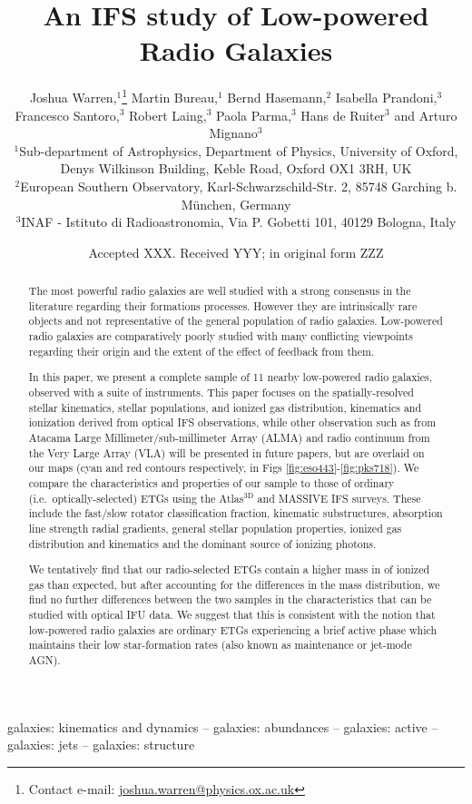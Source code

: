 \documentclass[a4paper,fleqn,usenatbib]{mnras}
\title[An IFS study of Low-powered Radio Galaxies]{An IFS study of Low-powered Radio Galaxies}
\author[J. Warren et al.]{
Joshua Warren,$^{1}$\thanks{Contact e-mail: \href{mailto:joshua.warren@physics.ox.ac.uk}{joshua.warren@physics.ox.ac.uk}}
Martin Bureau,$^{1}$
Bernd Hasemann,$^{2}$
Isabella Prandoni,$^{3}$ \newauthor
Francesco Santoro,$^{3}$
Robert Laing,$^{3}$
Paola Parma,$^{3}$
Hans de Ruiter$^{3}$
and \newauthor
Arturo Mignano$^{3}$
\\
$^{1}$Sub-department of Astrophysics, Department of Physics, University of Oxford, Denys Wilkinson Building, Keble Road, Oxford OX1 3RH, UK\\
$^{2}$European Southern Observatory, Karl-Schwarzschild-Str. 2, 85748 Garching b. München, Germany\\
$^{3}$INAF - Istituto di Radioastronomia, Via P. Gobetti 101, 40129 Bologna, Italy}
\date{Accepted XXX. Received YYY; in original form ZZZ}
\begin{document}
\label{firstpage}
\pagerange{\pageref{firstpage}--\pageref{lastpage}}
\maketitle

\begin{abstract}
The most powerful radio galaxies are well studied with a strong consensus in the literature regarding their formations processes. However they are intrinsically rare objects and not representative of the general population of radio galaxies. Low-powered radio galaxies are comparatively poorly studied with many conflicting viewpoints regarding their origin and the extent of the effect of feedback from them. 

In this paper, we present a complete sample of 11 nearby low-powered radio galaxies, observed with a suite of instruments. This paper focuses on the spatially-resolved stellar kinematics, stellar populations, and ionized gas distribution, kinematics and ionization derived from optical IFS observations, while other observation such as  from Atacama Large Millimeter/sub-millimeter Array (ALMA) and radio continuum from the Very Large Array (VLA) will be presented in future papers, but are overlaid on our maps (cyan and red contours respectively, in Figs \ref{fig:eso443}-\ref{fig:pks718}). We compare the characteristics and properties of our sample to those of ordinary (i.e.\ optically-selected) ETGs using the Atlas$^\text{3D}$ and MASSIVE IFS surveys. These include the fast/slow rotator classification fraction, kinematic substructures, absorption line strength radial gradients, general stellar population properties, ionized gas distribution and kinematics and the dominant source of ionizing photons.

We tentatively find that our radio-selected ETGs contain a higher mass in of ionized gas than expected, but after accounting for the differences in the mass distribution, we find no further differences between the two samples in the characteristics that can be studied with optical IFU data. We suggest that this is consistent with the notion that low-powered radio galaxies are ordinary ETGs experiencing a brief active phase which maintains their low star-formation rates (also known as maintenance or jet-mode AGN). 
\end{abstract}

\begin{keywords}
galaxies: kinematics and dynamics -- galaxies: abundances -- galaxies: active -- galaxies: jets -- galaxies: structure
\end{keywords}
\end{document}
